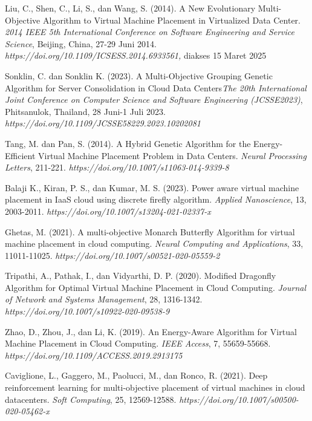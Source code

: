 \begin{thebibliography}{99}
	Liu, C., Shen, C., Li, S., dan Wang, S. (2014). A New Evolutionary Multi-Objective Algorithm to Virtual Machine Placement in Virtualized Data Center. \textit{2014 IEEE 5th International Conference on Software Engineering and Service Science}, Beijing, China, 27-29 Juni 2014. \textit{https://doi.org/10.1109/ICSESS.2014.6933561,} diakses 15 Maret 2025 
	
	Sonklin, C. dan Sonklin K. (2023). A Multi-Objective Grouping Genetic Algorithm for Server Consolidation in Cloud Data Centers\textit{The 20th International Joint Conference on Computer Science and Software Engineering (JCSSE2023)}, Phitsanulok, Thailand, 28 Juni-1 Juli 2023. \textit{https://doi.org/10.1109/JCSSE58229.2023.10202081}
	
	Tang, M. dan Pan, S. (2014). A Hybrid Genetic Algorithm for the Energy-Efficient Virtual Machine Placement Problem in Data Centers. \textit{Neural Processing Letters}, 211-221. \textit{https://doi.org/10.1007/s11063-014-9339-8}
	
	Balaji K., Kiran, P. S., dan Kumar, M. S. (2023). Power aware virtual machine placement in IaaS cloud using discrete firefly algorithm. \textit{Applied Nanoscience}, 13, 2003-2011. \textit{https://doi.org/10.1007/s13204-021-02337-x}

	Ghetas, M. (2021). A multi-objective Monarch Butterfly Algorithm for virtual machine placement in cloud computing. \textit{Neural Computing and Applications}, 33, 11011-11025. \textit{https://doi.org/10.1007/s00521-020-05559-2} 
	
	Tripathi, A., Pathak, I., dan Vidyarthi, D. P. (2020). Modified Dragonfly Algorithm for Optimal Virtual Machine Placement in Cloud Computing. \textit{Journal of Network and Systems Management}, 28, 1316-1342. \textit{https://doi.org/10.1007/s10922-020-09538-9}
	
	Zhao, D., Zhou, J., dan Li, K. (2019). An Energy-Aware Algorithm for Virtual Machine Placement in Cloud Computing. \textit{IEEE Access}, 7, 55659-55668. \textit{https://doi.org/10.1109/ACCESS.2019.2913175}
	
	Caviglione, L., Gaggero, M., Paolucci, M., dan Ronco, R. (2021). Deep reinforcement learning for multi-objective placement of virtual machines in cloud datacenters. \textit{Soft Computing}, 25, 12569-12588. \textit{https://doi.org/10.1007/s00500-020-05462-x} 
	

\end{thebibliography}
